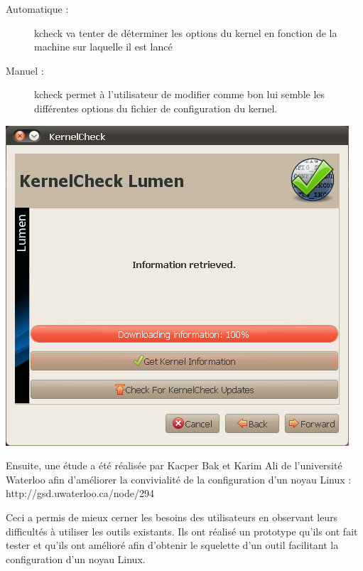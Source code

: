 \documentclass[16pts]{report}
\begin{document}
\begin{description}
\begin{description}
    \item[Automatique :] kcheck va tenter de déterminer les options du kernel
        en fonction de la machine sur laquelle il est lancé
    \item[Manuel :] kcheck permet à l’utilisateur de modifier comme bon lui
        semble les différentes options du fichier de configuration du kernel.
\end{description}
    \includegraphics[scale=0.8]{illustrations/KernelCheck.png}\\
\end{description}

Ensuite, une étude a été réalisée par Kacper Bak et Karim Ali de
    l’université Waterloo afin d’améliorer la convivialité de la configuration
    d’un noyau Linux : http://gsd.uwaterloo.ca/node/294

Ceci a permis de mieux cerner les besoins des utilisateurs en observant
    leurs difficultés à utiliser les outils existants. Ils ont réalisé
    un prototype qu’ils ont fait tester et qu’ils ont amélioré afin d’obtenir
    le squelette d’un outil facilitant la configuration d’un noyau Linux. \\
\end{document}
